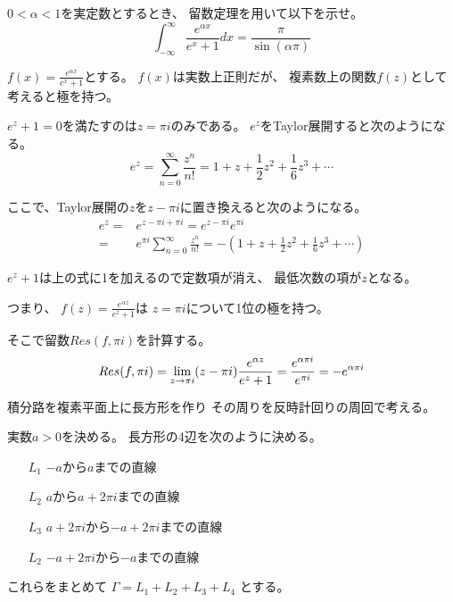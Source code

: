 \documentclass[12pt,b5paper]{ltjsarticle}
\begin{document}
\hrulefill

$0< \alpha < 1$を実定数とするとき、
留数定理を用いて以下を示せ。
\begin{equation}
 \int_{-\infty}^{\infty} \frac{e^{\alpha x}}{e^{x}+1}dx
  = \frac{\pi}{\sin{(\alpha\pi)}}
\end{equation}

\dotfill


$f(x)=\frac{e^{\alpha x}}{e^{x}+1}$とする。
$f(x)$は実数上正則だが、
複素数上の関数$f(z)$として考えると極を持つ。

$e^{z}+1=0$を満たすのは$z=\pi i$のみである。
$e^{z}$をTaylor展開すると次のようになる。
\begin{equation}
 e^{z}=\sum_{n=0}^{\infty}\frac{z^n}{n!}
  = 1 + z + \frac{1}{2}z^{2} + \frac{1}{6}z^{3} + \cdots
\end{equation}

ここで、Taylor展開の$z$を$z-\pi i$に置き換えると次のようになる。
\begin{align}
 e^{z} =& e^{z-\pi i + \pi i}
  = e^{z-\pi i} e^{\pi i}\\
 =& e^{\pi i} \sum_{n=0}^{\infty}\frac{z^n}{n!}
 = -\left( 1 + z + \frac{1}{2}z^{2} + \frac{1}{6}z^{3} + \cdots \right)
\end{align}

$e^z+1$は上の式に1を加えるので定数項が消え、
最低次数の項が$z$となる。

つまり、
$f(z)=\frac{e^{\alpha z}}{e^{z}+1}$は
$z=\pi i$について1位の極を持つ。

そこで留数$Res(f,\pi i)$を計算する。
\begin{equation}
 Res(f,\pi i)
 = \lim_{z\to \pi i}(z-\pi i) \frac{e^{\alpha z}}{e^{z}+1}\\
 = \frac{e^{\alpha \pi i}}{e^{\pi i}}
  = -e^{\alpha \pi i}
  \label{res_value}
\end{equation}

積分路を複素平面上に長方形を作り
その周りを反時計回りの周回で考える。

実数$a > 0$を決める。
長方形の4辺を次のように決める。
\begin{itemize}
 \item [$L_1$]
       $-a$から$a$までの直線
 \item [$L_2$]
       $a$から$a+2\pi i$までの直線
 \item [$L_3$]
       $a+2\pi i$から$-a+2\pi i$までの直線
 \item [$L_2$]
       $-a+2\pi i$から$-a$までの直線
\end{itemize}
これらをまとめて
$\Gamma = L_1 + L_2 + L_3 + L_4$
とする。
\end{document}
